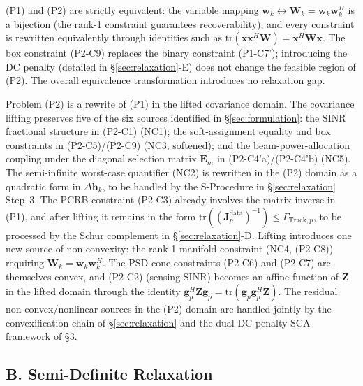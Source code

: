 \documentclass[12pt,a4paper]{article}
\newcommand{\vect}[1]{\mathbf{#1}}
\newcommand{\mat}[1]{\mathbf{#1}}
\newcommand{\tr}{\text{tr}}
\begin{document}
(P1) and (P2) are strictly equivalent: the variable mapping $\vect{w}_k \leftrightarrow \mat{W}_k = \vect{w}_k \vect{w}_k^H$ is a bijection (the rank-1 constraint guarantees recoverability), and every constraint is rewritten equivalently through identities such as $\tr(\vect{x}\vect{x}^H \mat{W}) = \vect{x}^H \mat{W} \vect{x}$. The box constraint (P2-C9) replaces the binary constraint (P1-C7'); introducing the DC penalty (detailed in \S\ref{sec:relaxation}-E) does not change the feasible region of (P2). The overall equivalence transformation introduces no relaxation gap.

Problem (P2) is a rewrite of (P1) in the lifted covariance domain. The covariance lifting preserves five of the six sources identified in \S\ref{sec:formulation}: the SINR fractional structure in (P2-C1) (NC1); the soft-assignment equality and box constraints in (P2-C5)/(P2-C9) (NC3, softened); and the beam-power-allocation coupling under the diagonal selection matrix $\mat{E}_m$ in (P2-C4'a)/(P2-C4'b) (NC5). The semi-infinite worst-case quantifier (NC2) is rewritten in the (P2) domain as a quadratic form in $\Delta\vect{h}_k$, to be handled by the S-Procedure in \S\ref{sec:relaxation} Step~3. The PCRB constraint (P2-C3) already involves the matrix inverse in (P1), and after lifting it remains in the form $\tr((\mat{J}_p^{\text{data}})^{-1}) \leq \Gamma_{\text{Track},p}$, to be processed by the Schur complement in \S\ref{sec:relaxation}-D. Lifting introduces one new source of non-convexity: the rank-1 manifold constraint (NC4, (P2-C8)) requiring $\mat{W}_k = \vect{w}_k \vect{w}_k^H$. The PSD cone constraints (P2-C6) and (P2-C7) are themselves convex, and (P2-C2) (sensing SINR) becomes an affine function of $\mat{Z}$ in the lifted domain through the identity $\vect{g}_p^H \mat{Z} \vect{g}_p = \tr(\vect{g}_p \vect{g}_p^H \mat{Z})$. The residual non-convex/nonlinear sources in the (P2) domain are handled jointly by the convexification chain of \S\ref{sec:relaxation} and the dual DC penalty SCA framework of \S3.

\subsection*{B. Semi-Definite Relaxation}
\end{document}
